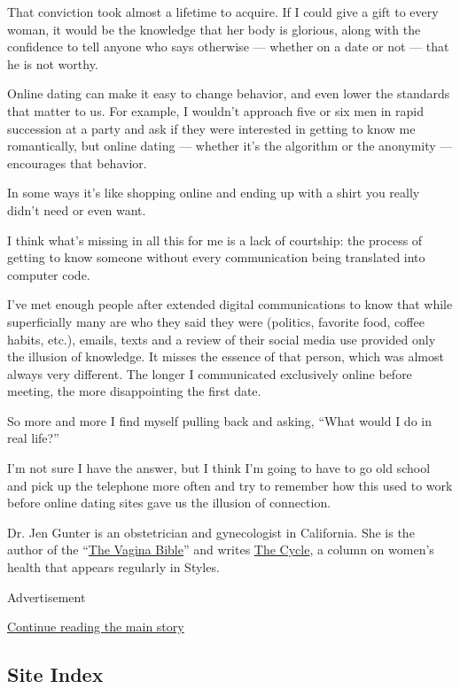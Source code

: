That conviction took almost a lifetime to acquire. If I could give a
gift to every woman, it would be the knowledge that her body is
glorious, along with the confidence to tell anyone who says otherwise
--- whether on a date or not --- that he is not worthy.

Online dating can make it easy to change behavior, and even lower the
standards that matter to us. For example, I wouldn't approach five or
six men in rapid succession at a party and ask if they were interested
in getting to know me romantically, but online dating --- whether it's
the algorithm or the anonymity --- encourages that behavior.

In some ways it's like shopping online and ending up with a shirt you
really didn't need or even want.

I think what's missing in all this for me is a lack of courtship: the
process of getting to know someone without every communication being
translated into computer code.

I've met enough people after extended digital communications to know
that while superficially many are who they said they were (politics,
favorite food, coffee habits, etc.), emails, texts and a review of their
social media use provided only the illusion of knowledge. It misses the
essence of that person, which was almost always very different. The
longer I communicated exclusively online before meeting, the more
disappointing the first date.

So more and more I find myself pulling back and asking, ``What would I
do in real life?''

I'm not sure I have the answer, but I think I'm going to have to go old
school and pick up the telephone more often and try to remember how this
used to work before online dating sites gave us the illusion of
connection.

Dr. Jen Gunter is an obstetrician and gynecologist in California. She is
the author of the
``\href{https://www.penguinrandomhouse.ca/books/636190/the-vagina-bible-by-dr-jen-gunter/9780735277373}{The
Vagina Bible}'' and writes
\href{https://www.nytimes3xbfgragh.onion/column/the-cycle}{The Cycle}, a
column on women's health that appears regularly in Styles.

Advertisement

\protect\hyperlink{after-bottom}{Continue reading the main story}

\hypertarget{site-index}{%
\subsection{Site Index}\label{site-index}}

